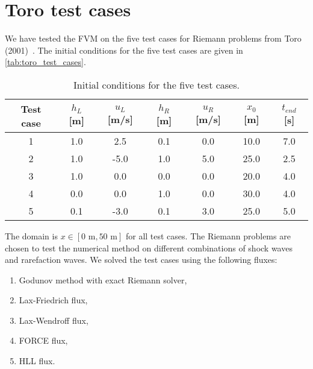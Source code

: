 \section{Toro test cases}\label{sec:toro_test_cases}
We have tested the FVM on the five test cases for Riemann problems from Toro (2001)~\cite{Toro2001-Shock}.
The initial conditions for the five test cases are given in \autoref{tab:toro_test_cases}.
\begin{table}[H]
    \centering
    \begin{tabular}{c|c|c|c|c|c|c}
        \hline
        \textbf{Test case} & \textbf{$h_L$} [m] & \textbf{$u_L$} [m/s] & \textbf{$h_R$} [m] & \textbf{$u_R$} [m/s] & \textbf{$x_0$} [m] & \textbf{$t_{end}$} [s] \\
        \hline\hline
        1 & 1.0 & 2.5 & 0.1 & 0.0 & 10.0 & 7.0 \\
        2 & 1.0 & -5.0 & 1.0 & 5.0 & 25.0 & 2.5 \\
        3 & 1.0 & 0.0 & 0.0 & 0.0 & 20.0 & 4.0 \\
        4 & 0.0 & 0.0 & 1.0 & 0.0 & 30.0 & 4.0 \\
        5 & 0.1 & -3.0 & 0.1 & 3.0 & 25.0 & 5.0 \\
        \hline
    \end{tabular}
    \caption{Initial conditions for the five test cases.}\label{tab:toro_test_cases}
\end{table}
The domain is $x \in [0 \text{ m}, 50 \text{ m}]$ for all test cases.
The Riemann problems are chosen to test the numerical method on different combinations of shock waves and rarefaction waves.
We solved the test cases using the following fluxes: 
\begin{enumerate}
    \item Godunov method with exact Riemann solver,
    \item Lax-Friedrich flux,
    \item Lax-Wendroff flux,
    \item FORCE flux,
    \item HLL flux.
\end{enumerate}


